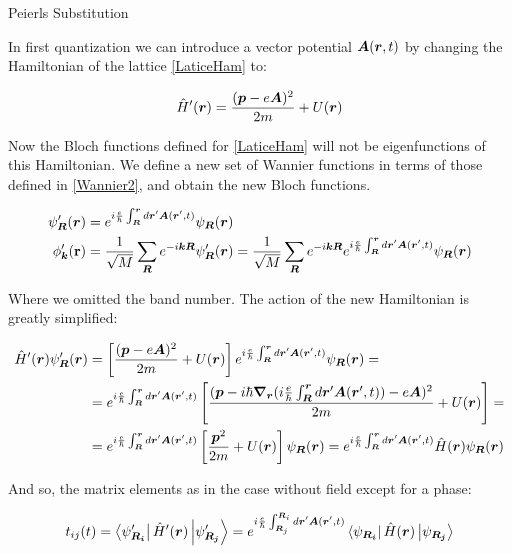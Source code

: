 \begin{subappendices}
\begin{section}{Peierls Substitution}
\label{AP3A}

In first quantization we can introduce a vector potential $\boldsymbol{A}(\boldsymbol{r},t)$ by changing the Hamiltonian of the lattice \ref{LaticeHam} to:

\begin{equation}
\label{HamEMF}
  \hat{H}'(\boldsymbol{r}) = \frac{(\boldsymbol{p}-e\boldsymbol{A})^2}{2m} +U(\boldsymbol{r})
\end{equation}

Now the Bloch functions defined for \ref{LaticeHam} will not be eigenfunctions of this Hamiltonian. We define a new set of Wannier functions in terms of those defined in \ref{Wannier2}, and obtain the new Bloch functions. 

\begin{align}
\psi'_{\boldsymbol{R}}(\boldsymbol{r}) &= e^{i\frac{e}{\hbar}\int_{\boldsymbol{R}}^{\boldsymbol{r}} d\boldsymbol{r}'\boldsymbol{A}(\boldsymbol{r}',t)} \psi_{\boldsymbol{R}}(\boldsymbol{r}) \\
\phi'_{\boldsymbol{k}}(\textbf{r}) &= \frac{1}{\sqrt{M}}\sum_{\boldsymbol{R}} e^{-i\boldsymbol{k}\boldsymbol{R}}\psi'_{\boldsymbol{R}}(\boldsymbol{r}) = \frac{1}{\sqrt{M}}\sum_{\boldsymbol{R}} e^{-i\boldsymbol{k}\boldsymbol{R}} e^{i\frac{e}{\hbar}\int_{\boldsymbol{R}}^{\boldsymbol{r}} d\boldsymbol{r}'\boldsymbol{A}(\boldsymbol{r}',t)} \psi_{\boldsymbol{R}}(\boldsymbol{r})
\end{align}

Where we omitted the band number. The action of the new Hamiltonian is greatly simplified:

\begin{align*}
\hat{H}'(\boldsymbol{r}) \psi'_{\boldsymbol{R}} (\boldsymbol{r}) &= \left[ \frac{(\boldsymbol{p}-e\boldsymbol{A})^2}{2m} +U(\boldsymbol{r}) \right] e^{i\frac{e}{\hbar}\int_{\boldsymbol{R}}^{\boldsymbol{r}} d\boldsymbol{r}'\boldsymbol{A}(\boldsymbol{r}',t)} \psi_{\boldsymbol{R}}(\boldsymbol{r}) = \\
&=e^{i\frac{e}{\hbar}\int_{\boldsymbol{R}}^{\boldsymbol{r}} d\boldsymbol{r}'\boldsymbol{A}(\boldsymbol{r}',t)} \left[ \frac{(\boldsymbol{p} - i\hbar \boldsymbol{\nabla_r}(i\frac{e}{\hbar}\int_{\boldsymbol{R}}^{\boldsymbol{r}} d\boldsymbol{r}'\boldsymbol{A}(\boldsymbol{r}',t)) -e\boldsymbol{A})^2}{2m} +U(\boldsymbol{r}) \right] = \\
&= e^{i\frac{e}{\hbar}\int_{\boldsymbol{R}}^{\boldsymbol{r}} d\boldsymbol{r}'\boldsymbol{A}(\boldsymbol{r}',t)} \left[ \frac{\boldsymbol{p}^2}{2m} + U(\boldsymbol{r}) \right] \psi_{\boldsymbol{R}}(\boldsymbol{r}) = e^{i\frac{e}{\hbar}\int_{\boldsymbol{R}}^{\boldsymbol{r}} d\boldsymbol{r}'\boldsymbol{A}(\boldsymbol{r}',t)} \hat{H}(\boldsymbol{r}) \psi_{\boldsymbol{R}}(\boldsymbol{r})
\end{align*}

And so, the matrix elements as in the case without field except for a phase:

\begin{equation}
\label{PeierlsMtxElem}
t_{ij}(t) = \bra{\psi'_{\boldsymbol{R_i}}} \hat{H}'(\boldsymbol{r}) \ket{\psi'_{\boldsymbol{R_j}}} = e^{i\frac{e}{\hbar}\int_{\boldsymbol{R}_j}^{\boldsymbol{R}_i} d\boldsymbol{r}'\boldsymbol{A}(\boldsymbol{r}',t)} \bra{\psi_{\boldsymbol{R_i}}} \hat{H}(\boldsymbol{r}) \ket{\psi_{\boldsymbol{R_j}}}
\end{equation}


\end{section}
\end{subappendices}
